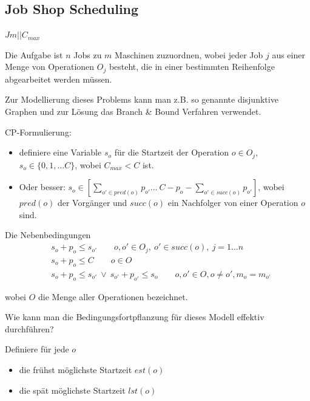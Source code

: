 \documentclass[hyperref={pdfpagelabels=false}]{beamer}
\begin{document}
\subsection{Job Shop Scheduling}
\begin{frame}[allowframebreaks]{$Jm||C_{max}$}
\nocite{CSP}
\small 

\vspace{40pt}
\begin{block}{}
Die Aufgabe ist $n$ Jobs zu $m$ Maschinen zuzuordnen, wobei jeder Job $j$ aus einer Menge von Operationen $O_j$ besteht, die in einer bestimmten Reihenfolge abgearbeitet werden müssen.
\end{block}

\begin{block}{}
Zur Modellierung dieses Problems kann man z.B. so genannte {\color{darkred}disjunktive Graphen} und
zur Lösung das {\color{darkred}Branch \& Bound} Verfahren verwendet.
\end{block}

\newpage

CP-Formulierung:
\begin{itemize}
\item definiere eine Variable $s_o$ für die Startzeit der Operation $o\in O_j$, $s_o\in \{0,1,\dots C\}$, wobei $C_{max}<C$ ist. 
\item Oder besser:  $s_o\in[\sum_{o'\in pred(o)}p_{o'}\dots\ C-p_o-\sum_{o'\in succ(o)}p_{o'}]$, wobei $pred(o)$ der Vorgänger und $succ(o)$ ein Nachfolger von einer Operation $o$ sind.
\end{itemize}

\begin{block}{Die Nebenbedingungen} \begin{align}
 & s_o + p_o \le s_{o'} \qquad  o,o'\in O_j,\ o'\in succ(o),\ j=1\dots n \nonumber \\
 & s_o + p_o \le C \qquad  o\in O \nonumber \\
 & s_o + p_o \le s_{o'}\  \vee\ s_{o'} + p_{o'} \le s_{o} \qquad o,o'\in O, o\not=o', m_o=m_{o'} \nonumber 
\end{align}
\end{block}
wobei $O$ die Menge aller Operationen bezeichnet.


\newpage

Wie kann man die Bedingungsfortpflanzung für dieses Modell effektiv durchführen? 

Definiere für jede $o$ 
\begin{itemize}
\item die frühst möglichste Startzeit $est(o)$
\item die spät möglichste Startzeit $lst(o)$
\end{itemize}


\end{frame}
\end{document}
